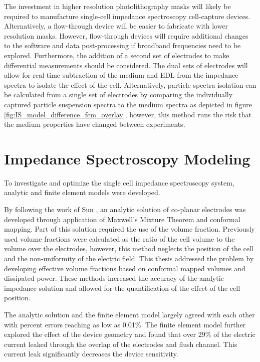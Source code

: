 \par The investment in higher resolution photolithography masks will likely be required to manufacture single-cell impedance spectroscopy cell-capture devices. Alternatively, a flow-through device will be easier to fabricate with lower resolution masks. However, flow-through devices will require additional changes to the software and data post-processing if broadband frequencies need to be explored. Furthermore, the addition of a second set of electrodes to make differential measurements should be considered. The dual sets of electrodes will allow for real-time subtraction of the medium and EDL from the impedance spectra to isolate the effect of the cell. Alternatively, particle spectra isolation can be calculated from a single set of electrodes by comparing the individually captured particle suspension spectra to the medium spectra as depicted in figure \ref{fig:IS_model_difference_fcm_overlay}, however, this method runs the risk that the medium properties have changed between experiments.

\section{Impedance Spectroscopy Modeling}

\par To investigate and optimize the single cell impedance spectroscopy system, analytic and finite element models were developed. 

\par By following the work of Sun \cite{sun_analytical_2007}, an analytic solution of co-planar electrodes was developed through application of Maxwell's Mixture Theorem and conformal mapping. Part of this solution required the use of the volume fraction. Previously used volume fractions were calculated as the ratio of the cell volume to the volume over the electrodes, however, this method neglects the position of the cell and the non-uniformity of the electric field. This thesis addressed the problem by developing effective volume fractions based on conformal mapped volumes and dissipated power. These methods increased the accuracy of the analytic impedance solution and allowed for the quantification of the effect of the cell position.

\par The analytic solution and the finite element model largely agreed with each other with percent errors reaching as low as 0.01\%. The finite element model further explored the effect of the device geometry and found that over 29\% of the electric current leaked through the overlap of the electrodes and flush channel. This current leak significantly decreases the device sensitivity. 


